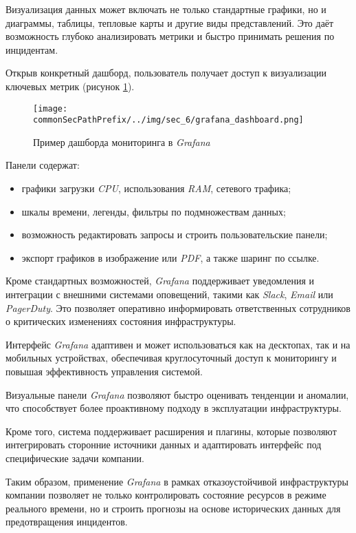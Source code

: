 Визуализация данных может включать не только стандартные графики, но и диаграммы, таблицы, тепловые карты и другие виды представлений. Это даёт возможность глубоко анализировать метрики и быстро принимать решения по инцидентам.

Открыв конкретный дашборд, пользователь получает доступ к визуализации ключевых метрик (рисунок \ref{fig:user_guide:grafana_dashboard}).

\begin{figure}[ht]
    \centering
    \texttt{[image: \\commonSecPathPrefix/../img/sec\_6/grafana\_dashboard.png]}
    \caption{Пример дашборда мониторинга в \textit{Grafana}}
    \label{fig:user_guide:grafana_dashboard}
\end{figure}

Панели содержат:
\begin{itemize}
    \item графики загрузки \textit{CPU}, использования \textit{RAM}, сетевого трафика;
    \item шкалы времени, легенды, фильтры по подмножествам данных;
    \item возможность редактировать запросы и строить пользовательские панели;
    \item экспорт графиков в изображение или \textit{PDF}, а также шаринг по ссылке.
\end{itemize}

Кроме стандартных возможностей, \textit{Grafana} поддерживает уведомления и интеграции с внешними системами оповещений, такими как \textit{Slack}, \textit{Email} или \textit{PagerDuty}. Это позволяет оперативно информировать ответственных сотрудников о критических изменениях состояния инфраструктуры.

Интерфейс \textit{Grafana} адаптивен и может использоваться как на десктопах, так и на мобильных устройствах, обеспечивая круглосуточный доступ к мониторингу и повышая эффективность управления системой.

Визуальные панели \textit{Grafana} позволяют быстро оценивать тенденции и аномалии, что способствует более проактивному подходу в эксплуатации инфраструктуры.

Кроме того, система поддерживает расширения и плагины, которые позволяют интегрировать сторонние источники данных и адаптировать интерфейс под специфические задачи компании.

Таким образом, применение \textit{Grafana} в рамках отказоустойчивой инфраструктуры компании позволяет не только контролировать состояние ресурсов в режиме реального времени, но и строить прогнозы на основе исторических данных для предотвращения инцидентов.


